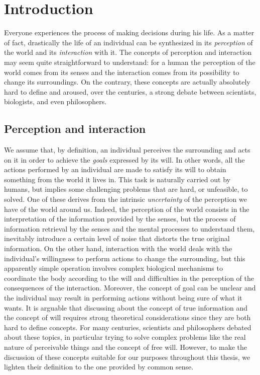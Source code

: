 \chapter{Introduction}\label{C:intro}
Everyone experiences the process of making decisions during his life. As a matter of fact, drastically the life of an individual can be synthesized in its \textit{perception} of the world and its \textit{interaction} with it. The concepts of perception and interaction may seem quite straightforward to understand: for a human the perception of the world comes from its senses and the interaction comes from its possibility to change its surroundings. On the contrary, these concepts are actually absolutely hard to define and aroused, over the centuries, a strong debate between scientists, biologists, and even philosophers.

\section{Perception and interaction}
We assume that, by definition, an individual perceives the surrounding and acts on it in order to achieve the \textit{goals} expressed by its will. In other words, all the actions performed by an individual are made to satisfy its will to obtain something from the world it lives in. This task is naturally carried out by humans, but implies some challenging problems that are hard, or unfeasible, to solved. One of these derives from the intrinsic \textit{uncertainty} of the perception we have of the world around us. Indeed, the perception of the world consists in the interpretation of the information provided by the senses, but the process of information retrieval by the senses and the mental processes to understand them, inevitably introduce a certain level of noise that distorts the true original information. On the other hand, interaction with the world deals with the individual's willingness to perform actions to change the surrounding, but this apparently simple operation involves complex biological mechanisms to coordinate the body according to the will and difficulties in the perception of the consequences of the interaction. Moreover, the concept of goal can be unclear and the individual may result in performing actions without being sure of what it wants.
It is arguable that discussing about the concept of true information and the concept of will requires strong theoretical considerations since they are both hard to define concepts. For many centuries, scientists and philosophers debated about these topics, in particular trying to solve complex problems like the real nature of perceivable things and the concept of free will. However, to make the discussion of these concepts suitable for our purposes throughout this thesis, we lighten their definition to the one provided by common sense.

